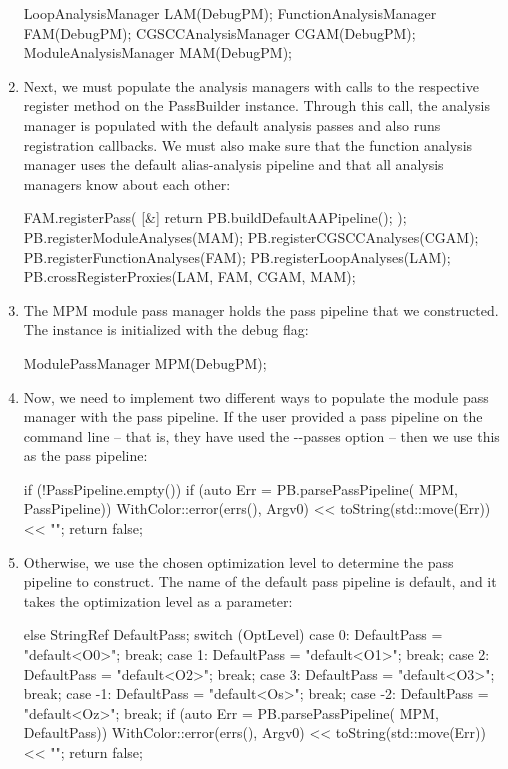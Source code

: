\begin{enumerate}
\begin{cpp}
LoopAnalysisManager LAM(DebugPM);
FunctionAnalysisManager FAM(DebugPM);
CGSCCAnalysisManager CGAM(DebugPM);
ModuleAnalysisManager MAM(DebugPM);
\end{cpp}

\item
Next, we must populate the analysis managers with calls to the respective register method on the PassBuilder instance. Through this call, the analysis manager is populated with the default analysis passes and also runs registration callbacks. We must also make sure that the function analysis manager uses the default alias-analysis pipeline and that all analysis managers know about each other:

\begin{cpp}
FAM.registerPass(
    [&] { return PB.buildDefaultAAPipeline(); });
PB.registerModuleAnalyses(MAM);
PB.registerCGSCCAnalyses(CGAM);
PB.registerFunctionAnalyses(FAM);
PB.registerLoopAnalyses(LAM);
PB.crossRegisterProxies(LAM, FAM, CGAM, MAM);
\end{cpp}

\item
The MPM module pass manager holds the pass pipeline that we constructed. The instance is initialized with the debug flag:

\begin{cpp}
ModulePassManager MPM(DebugPM);
\end{cpp}

\item
Now, we need to implement two different ways to populate the module pass manager with the pass pipeline. If the user provided a pass pipeline on the command line – that is, they have used the -{}-passes option – then we use this as the pass pipeline:

\begin{cpp}
if (!PassPipeline.empty()) {
    if (auto Err = PB.parsePassPipeline(
    MPM, PassPipeline)) {
        WithColor::error(errs(), Argv0)
        << toString(std::move(Err)) << "\n";
        return false;
    }
}
\end{cpp}

\item
Otherwise, we use the chosen optimization level to determine the pass pipeline to construct. The name of the default pass pipeline is default, and it takes the optimization level as a parameter:

\begin{cpp}
else {
    StringRef DefaultPass;
    switch (OptLevel) {
        case 0: DefaultPass = "default<O0>"; break;
        case 1: DefaultPass = "default<O1>"; break;
        case 2: DefaultPass = "default<O2>"; break;
        case 3: DefaultPass = "default<O3>"; break;
        case -1: DefaultPass = "default<Os>"; break;
        case -2: DefaultPass = "default<Oz>"; break;
    }
    if (auto Err = PB.parsePassPipeline(
            MPM, DefaultPass)) {
        WithColor::error(errs(), Argv0)
        << toString(std::move(Err)) << "\n";
        return false;
    }
}
\end{cpp}



\end{enumerate}
